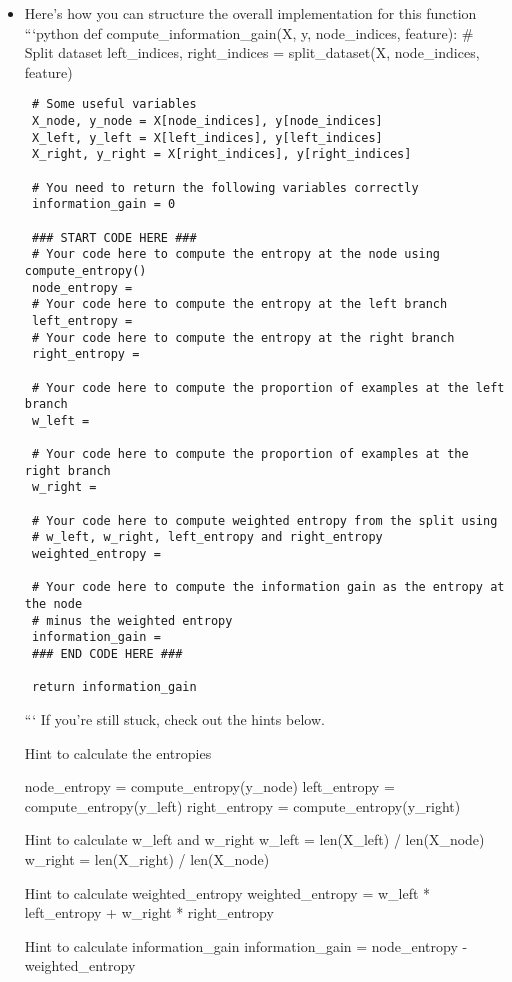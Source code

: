 \documentclass[11pt]{article}
\begin{document}
\begin{itemize}
\item
  Here's how you can structure the overall implementation for this
  function ```python def compute\_information\_gain(X, y, node\_indices,
  feature): \# Split dataset left\_indices, right\_indices =
  split\_dataset(X, node\_indices, feature)

\begin{verbatim}
 # Some useful variables
 X_node, y_node = X[node_indices], y[node_indices]
 X_left, y_left = X[left_indices], y[left_indices]
 X_right, y_right = X[right_indices], y[right_indices]

 # You need to return the following variables correctly
 information_gain = 0

 ### START CODE HERE ###
 # Your code here to compute the entropy at the node using compute_entropy()
 node_entropy = 
 # Your code here to compute the entropy at the left branch
 left_entropy = 
 # Your code here to compute the entropy at the right branch
 right_entropy = 

 # Your code here to compute the proportion of examples at the left branch
 w_left = 

 # Your code here to compute the proportion of examples at the right branch
 w_right = 

 # Your code here to compute weighted entropy from the split using 
 # w_left, w_right, left_entropy and right_entropy
 weighted_entropy = 

 # Your code here to compute the information gain as the entropy at the node
 # minus the weighted entropy
 information_gain = 
 ### END CODE HERE ###  

 return information_gain
\end{verbatim}

  ``` If you're still stuck, check out the hints below.

  Hint to calculate the entropies

  node\_entropy = compute\_entropy(y\_node) left\_entropy =
  compute\_entropy(y\_left) right\_entropy = compute\_entropy(y\_right)

  Hint to calculate w\_left and w\_right w\_left = len(X\_left) /
  len(X\_node) w\_right = len(X\_right) / len(X\_node)

  Hint to calculate weighted\_entropy weighted\_entropy = w\_left *
  left\_entropy + w\_right * right\_entropy

  Hint to calculate information\_gain information\_gain = node\_entropy
  - weighted\_entropy
\end{itemize}
\end{document}
